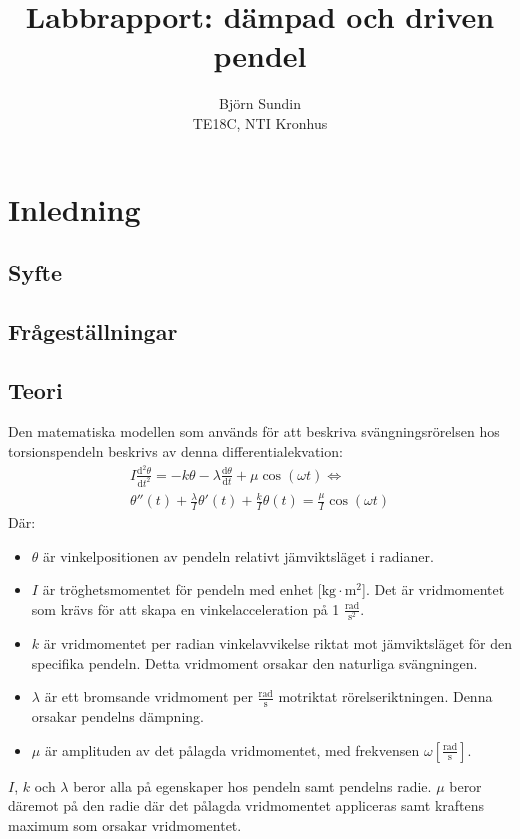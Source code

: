 \documentclass[12pt, a4paper]{article}
\title{Labbrapport: dämpad och driven pendel}
\author{Björn Sundin\medskip\\ TE18C, NTI Kronhus}
\begin{document}
\maketitle

\section{Inledning}
\subsection{Syfte}
\subsection{Frågeställningar}

\subsection{Teori}
Den matematiska modellen som används för att beskriva svängningsrörelsen hos torsionspendeln beskrivs av denna differentialekvation:
\begin{equation}
    \begin{split}
        I\frac{\mathrm{d}^2\theta}{\mathrm{d}t^2}=-k\theta-\lambda\frac{\mathrm{d}\theta}{\mathrm{d}t}+\mu\cos(\omega t)\Leftrightarrow\\
        \theta''(t)+\frac{\lambda}{I}\theta'(t)+\frac{k}{I}\theta(t)=\frac{\mu}{I}\cos(\omega t)        
    \end{split}
\end{equation}
Där: 
\begin{itemize}
    \item $\theta$ är vinkelpositionen av pendeln relativt jämviktsläget i radianer.
    \item $I$ är tröghetsmomentet för pendeln med enhet $[\mathrm{kg}\cdot\mathrm{m}^2$]. Det är vridmomentet som krävs för att skapa en vinkelacceleration på 1 $\frac{\mathrm{rad}}{\mathrm{s}^2}$.
    \item $k$ är vridmomentet per radian vinkelavvikelse riktat mot jämviktsläget för den specifika pendeln. Detta vridmoment orsakar den naturliga svängningen.
    \item $\lambda$ är ett bromsande vridmoment per $\frac{\mathrm{rad}}{\mathrm{s}}$ motriktat rörelseriktningen. Denna orsakar pendelns dämpning.
    \item $\mu$ är amplituden av det pålagda vridmomentet, med frekvensen $\omega [\frac{\mathrm{rad}}{\mathrm{s}}]$.
\end{itemize}
$I$, $k$ och $\lambda$ beror alla på egenskaper hos pendeln samt pendelns radie. $\mu$ beror däremot på den radie där det pålagda vridmomentet appliceras samt kraftens maximum som orsakar vridmomentet.
\end{document}
